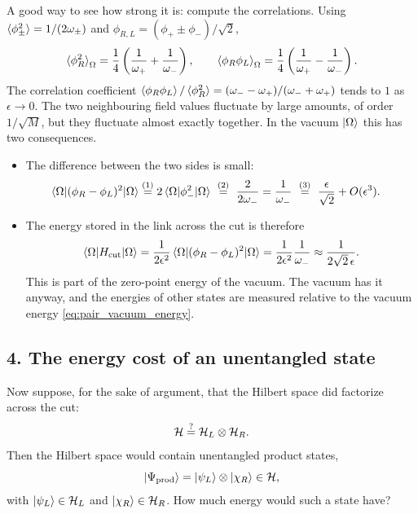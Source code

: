 A good way to see how strong it is: compute the correlations. Using
$\braket{\phi_\pm^2}=1/(2\omega_\pm)$ and $\phi_{R,L}=(\phi_+\pm\phi_-)/\sqrt2$,
\[
\braket{\phi_R^2}_\Omega = \frac14\left(\frac1{\omega_+}+\frac1{\omega_-}\right), \qquad
\braket{\phi_R\phi_L}_\Omega = \frac14\left(\frac1{\omega_+}-\frac1{\omega_-}\right).
\]
The correlation coefficient $\braket{\phi_R\phi_L}/\braket{\phi_R^2} = (\omega_- -
\omega_+)/(\omega_-+\omega_+)$ tends to $1$ as $\epsilon\to0$. The two neighbouring field values fluctuate
by large amounts, of order $1/\sqrt{M}$, but they fluctuate almost exactly together. In the vacuum
$\ket\Omega$ this has two consequences.
\begin{itemize}
\item The difference between the two sides is small:
\begin{align}
\braket{\Omega | (\phi_R - \phi_L)^2 | \Omega}
&\overset{(1)}{=} 2 \braket{\Omega | \phi_-^2 | \Omega}
\ \overset{(2)}{=}\ \frac{2}{2\omega_-} = \frac{1}{\omega_-}
\ \overset{(3)}{=}\ \frac{\epsilon}{\sqrt{2}} + O(\epsilon^3) .
\label{eq:vacuum_diff_exp}
\end{align}
\quad
{}\quad
{}
\item The energy stored in the link across the cut is therefore
\begin{equation}
\braket{\Omega | H_{\rm cut} | \Omega} = \frac{1}{2\epsilon^2} \braket{\Omega | (\phi_R - \phi_L)^2 | \Omega}
= \frac{1}{2\epsilon^2} \frac{1}{\omega_-} \approx \frac{1}{2\sqrt{2}\,\epsilon} .
\label{eq:vacuum_cut_energy}
\end{equation}
This is part of the zero-point energy of the vacuum. The vacuum has it anyway, and the energies of other
states are measured relative to the vacuum energy \eqref{eq:pair_vacuum_energy}.
\end{itemize}

\subsection*{4. The energy cost of an unentangled state}

Now suppose, for the sake of argument, that the Hilbert space did factorize across the cut:
\[
\mathcal{H} \stackrel{?}{=} \mathcal{H}_L \otimes \mathcal{H}_R .
\]
Then the Hilbert space would contain unentangled product states,
\begin{equation}
\ket{\Psi_{\rm prod}} = \ket{\psi_L} \otimes \ket{\chi_R} \in \mathcal{H} ,
\label{eq:hypothetical_product_state}
\end{equation}
with $\ket{\psi_L} \in \mathcal{H}_L$ and $\ket{\chi_R} \in \mathcal{H}_R$. How much energy would such a state have?

